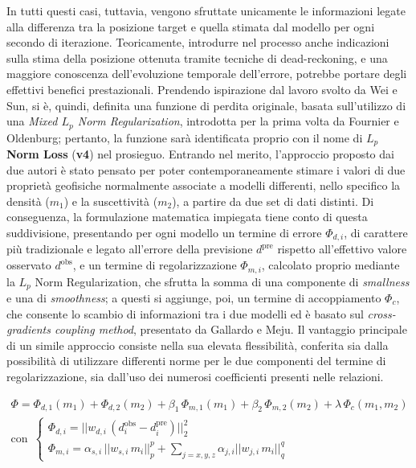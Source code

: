 In tutti questi casi, tuttavia, vengono sfruttate unicamente le informazioni legate alla differenza tra la posizione target e quella stimata dal modello per ogni secondo di iterazione. Teoricamente, introdurre nel processo anche indicazioni sulla stima della posizione ottenuta tramite tecniche di dead-reckoning, e una maggiore conoscenza dell'evoluzione temporale dell'errore, potrebbe portare degli effettivi benefici prestazionali. Prendendo ispirazione dal lavoro svolto da Wei e Sun\cite{Lp_Wei}, si è, quindi, definita una funzione di perdita originale, basata sull'utilizzo di una \textit{Mixed $L_p$ Norm Regularization}, introdotta per la prima volta da Fournier e Oldenburg\cite{Lp_norm_reg}; pertanto, la funzione sarà identificata proprio con il nome di \textbf{$L_p$ Norm Loss} (\textbf{v4}) nel prosieguo. Entrando nel merito, l'approccio proposto dai due autori è stato pensato per poter contemporaneamente stimare i valori di due proprietà geofisiche normalmente associate a modelli differenti, nello specifico la densità ($m_{1}$) e la suscettività ($m_{2}$), a partire da due set di dati distinti. Di conseguenza, la formulazione matematica impiegata tiene conto di questa suddivisione, presentando per ogni modello un termine di errore $\Phi_{d, i}$, di carattere più tradizionale e legato all'errore della previsione $d^{\text{pre}}$ rispetto all'effettivo valore osservato $d^{\text{obs}}$, e un termine di regolarizzazione $\Phi_{m, i}$, calcolato proprio mediante la $L_p$ Norm Regularization, che sfrutta la somma di una componente di \textit{smallness} e una di \textit{smoothness}; a questi si aggiunge, poi, un termine di accoppiamento $\Phi_{c}$, che consente lo scambio di informazioni tra i due modelli ed è basato sul \textit{cross-gradients coupling method}, presentato da Gallardo e Meju\cite{Cross_coupling_gradient}. Il vantaggio principale di un simile approccio consiste nella sua elevata flessibilità, conferita sia dalla possibilità di utilizzare differenti norme per le due componenti del termine di regolarizzazione, sia dall'uso dei numerosi coefficienti presenti nelle relazioni.  

    \begin{equation}
        \begin{aligned}
            \Phi = \Phi_{d,1}(m_{1}) + \Phi_{d, 2}(m_{2}) + \beta_{1} \, \Phi_{m, 1}(m_{1}) + \beta_{2} \, \Phi_{m, 2}(m_{2}) + \lambda \, \Phi_{c} (m_{1}, m_{2}) \\[0.25cm]
            \text{con} \, \, \, \begin{cases}
                \Phi_{d, i} = || w_{d, i} \, (d^{\text{obs}}_{i} - d^{\text{pre}}_{i}) ||_{2}^{2} \\[0.25cm]
                \Phi_{m, i} = \alpha_{s, i} \, || w_{s, i} \, m_{i} ||_{p}^{p} + \sum_{j = x,y,z} \alpha_{j, i} || w_{j, i} \, m_{i} ||_{q}^{q}
            \end{cases}
        \end{aligned}
        \label{eq:Lp_og}
    \end{equation}

